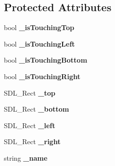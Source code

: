 \subsection*{Protected Attributes}
\begin{DoxyCompactItemize}
\item 
\hypertarget{class_x_d_l___game_object_a831c09ac74f88701a8b1ad1ee773243c}{bool {\bfseries \-\_\-is\-Touching\-Top}}\label{class_x_d_l___game_object_a831c09ac74f88701a8b1ad1ee773243c}

\item 
\hypertarget{class_x_d_l___game_object_acf27e266355faef774c46960b25bec62}{bool {\bfseries \-\_\-is\-Touching\-Left}}\label{class_x_d_l___game_object_acf27e266355faef774c46960b25bec62}

\item 
\hypertarget{class_x_d_l___game_object_ab1cceafdcbf60dee16895a40dc57ee87}{bool {\bfseries \-\_\-is\-Touching\-Bottom}}\label{class_x_d_l___game_object_ab1cceafdcbf60dee16895a40dc57ee87}

\item 
\hypertarget{class_x_d_l___game_object_a4c9e7620cc7c83e6e4a19b8293a35839}{bool {\bfseries \-\_\-is\-Touching\-Right}}\label{class_x_d_l___game_object_a4c9e7620cc7c83e6e4a19b8293a35839}

\item 
\hypertarget{class_x_d_l___game_object_ade8aa17dfc11e350aabd8bdd665288f9}{S\-D\-L\-\_\-\-Rect {\bfseries \-\_\-top}}\label{class_x_d_l___game_object_ade8aa17dfc11e350aabd8bdd665288f9}

\item 
\hypertarget{class_x_d_l___game_object_a0d1794642e4ea8631bcf288d007b0fcc}{S\-D\-L\-\_\-\-Rect {\bfseries \-\_\-bottom}}\label{class_x_d_l___game_object_a0d1794642e4ea8631bcf288d007b0fcc}

\item 
\hypertarget{class_x_d_l___game_object_aa41cd1d7a6db0bd20b0ec5b4ea805b8c}{S\-D\-L\-\_\-\-Rect {\bfseries \-\_\-left}}\label{class_x_d_l___game_object_aa41cd1d7a6db0bd20b0ec5b4ea805b8c}

\item 
\hypertarget{class_x_d_l___game_object_a9ce22f2ffd56bface1f7f9371a0dcadf}{S\-D\-L\-\_\-\-Rect {\bfseries \-\_\-right}}\label{class_x_d_l___game_object_a9ce22f2ffd56bface1f7f9371a0dcadf}

\item 
\hypertarget{class_x_d_l___game_object_a9881ae32dadb2ddaea8a2836c5fe62a3}{string {\bfseries \-\_\-name}}\label{class_x_d_l___game_object_a9881ae32dadb2ddaea8a2836c5fe62a3}

\end{DoxyCompactItemize}


